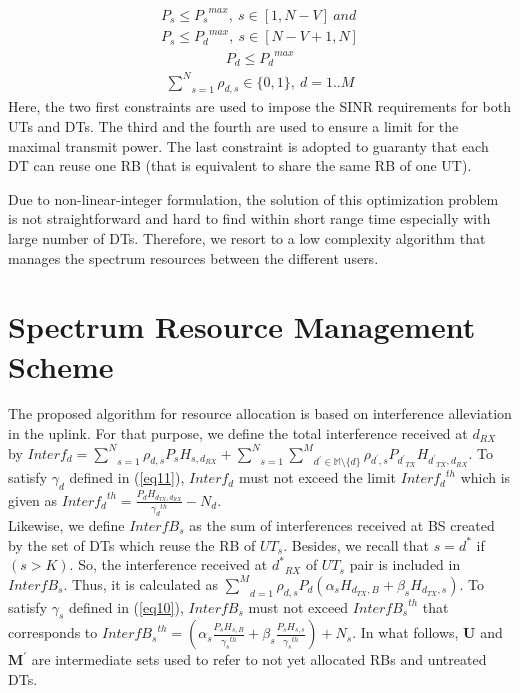 \documentclass[conference,onecolumn,12pt]{IEEEtran}
\begin{document}
\begin{equation} \label{eq12}
\begin{aligned}
P_s \leq {P_s}^{max},\ s\in [1, N-V]\ and \\P_s \leq {P_d}^{max},\ s\in [N-V+1,N]
\end{aligned}
\end{equation}
\begin{equation} \label{eq13}
\begin{aligned}
P_d \leq {P_d}^{max}
\end{aligned}
\end{equation}
\begin{equation} \label{eq14}
\begin{aligned}
\underset{s=1} {\overset{N}{\sum}} \rho_{d,s} \in \{0,1\},\ d=1..M
\end{aligned}
\end{equation}
Here, the two first constraints are used to impose the SINR requirements for both UTs and DTs. The third and the fourth are used to ensure a limit for the maximal transmit power. The last constraint is adopted to guaranty that each DT can reuse one RB (that is equivalent to share the same RB of one UT).

Due to non-linear-integer formulation, the solution of this optimization problem is not straightforward and hard to find within short range time especially with large number of DTs. Therefore, we resort to a low complexity algorithm that manages the spectrum resources between the different users.

\section{Spectrum Resource Management Scheme}
The proposed algorithm for resource allocation is based on interference alleviation in the uplink. For that purpose, we define the total interference received at $d_{RX}$ by $
Interf_d= \underset{s=1} {\overset{N}{\sum}} \rho_{d,s}P_s H_{s,d_{RX}} +\underset{s=1} {\overset{N}{\sum}} \underset{d^{'}\in \mathbb{M}\setminus \{d\}} {\overset{M}{\sum}} \rho_{d^{'},s} P_{{d^{'}}_{TX}} H_{{d^{'}}_{TX},d_{RX}}$. To satisfy $\gamma_d$ defined in (\ref{eq11}), $Interf_d$ must not exceed the limit ${Interf_d}^{th}$ which is given as ${Interf_d}^{th}=\frac{P_d H_{d_{TX},d_{RX}}}{{\gamma_d}^{th}}-N_d$.\\
Likewise, we define $InterfB_s$ as the sum of interferences received at BS created by the set of DTs which reuse the RB of $UT_s$. Besides, we recall that $s=d^{*}$ if $(s>K)$. So, the interference received at ${d^{*}}_{RX}$ of $UT_s$ pair is included in $InterfB_s$. Thus, it is calculated as $\underset{d=1} {\overset{M}{\sum}} \rho_{d,s} P_d(\alpha_sH_{d_{TX},B}+\beta_sH_{d_{TX},s}) $. To satisfy $\gamma_s$  defined in (\ref{eq10}), $InterfB_s$ must not exceed ${InterfB_s}^{th}$ that corresponds to $ {InterfB_s}^{th}=(\alpha_s \frac{P_s H_{s,B}}{ {\gamma_s}^{th}}+\beta_s \frac{P_s H_{s,s}}{ {\gamma_s}^{th}})+N_s$. In what follows, $\mathbf{U}$ and $\mathbf{M^{'}}$ are intermediate sets used to refer to not yet allocated RBs and untreated DTs.
\end{document}
